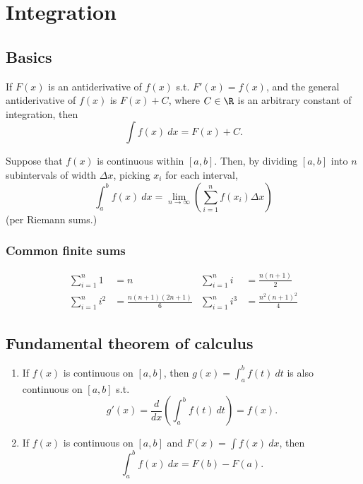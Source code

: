\documentclass[main.tex]{subfiles}
\begin{document}
\section{Integration}
\begin{multicols}{2}
	\subsection*{Basics}
	\begin{definition}
	If \(F(x)\) is an antiderivative of \(f(x)\) s.t. \(F'(x) = f(x)\),
	and the general antiderivative of \(f(x)\) is \(F(x) + C\),
	where \(C \in \R\) is an arbitrary constant of integration,
	then \[\int f(x) \ dx = F(x) + C.\]
	\end{definition}

	\begin{definition}
	Suppose that \(f(x)\) is continuous within \([a, b]\). Then, by dividing \([a, b]\) into \(n\) subintervals of width \(\Delta x\), picking \(x_i\) for each interval,
	\[\int_{a}^b f(x) \ dx = \lim_{n \to \infty}{\left(\sum_{i = 1}^n f(x_i) \Delta x  \right)}\] (per Riemann sums.)
	\end{definition}

	\subsubsection*{Common finite sums}
	\begin{align*}
	\sum_{i = 1}^n 1 &= n & \sum_{i = 1}^n i &= \frac{n(n + 1)}{2} \\
	\sum_{i = 1}^n i^2 &= \frac{n(n + 1)(2n + 1)}{6} & \sum_{i = 1}^n i^3 &= \frac{n^2(n + 1)^2}{4}
	\end{align*}

	\subsection*{Fundamental theorem of calculus}
	\begin{enumerate}
	\item If \(f(x)\) is continuous on \([a, b]\), then
	\(g(x) = \int_a^b f(t) \ dt\) is also continuous on \([a, b]\) s.t.
	\[g'(x) = \frac{d}{dx} \left(\int_a^b f(t) \ dt \right) = f(x).\]
	\item If \(f(x)\) is continuous on \([a, b]\) and \(F(x) = \int f(x) \ dx\), then
	\[\int_a^b f(x) \ dx = F(b) - F(a).\]
	\end{enumerate}


\end{multicols}
\end{document}
